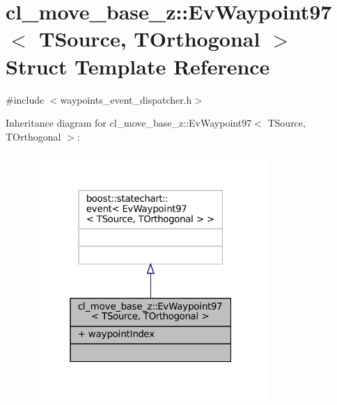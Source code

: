 \hypertarget{structcl__move__base__z_1_1EvWaypoint97}{}\section{cl\+\_\+move\+\_\+base\+\_\+z\+:\+:Ev\+Waypoint97$<$ T\+Source, T\+Orthogonal $>$ Struct Template Reference}
\label{structcl__move__base__z_1_1EvWaypoint97}


{\ttfamily \#include $<$waypoints\+\_\+event\+\_\+dispatcher.\+h$>$}



Inheritance diagram for cl\+\_\+move\+\_\+base\+\_\+z\+:\+:Ev\+Waypoint97$<$ T\+Source, T\+Orthogonal $>$\+:
\nopagebreak
\begin{figure}[H]
\begin{center}
\leavevmode
\includegraphics[width=253pt]{structcl__move__base__z_1_1EvWaypoint97__inherit__graph}
\end{center}
\end{figure}


